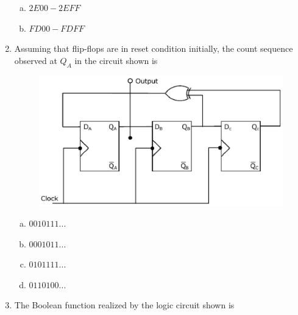 \documentclass[journal,12pt,twocolumn]{IEEEtran}
\begin{document}
\begin{enumerate}
\begin{enumerate}[(a)]
\item $ 2E00 - 2EFF $

\item $ FD00 - FDFF $

\end{enumerate}

\item Assuming that flip-flops are in reset condition initially, the count sequence observed at $Q_A$ in the circuit shown is 

\begin{figure}

\centering

\includegraphics[width=\columnwidth]{./figs/44.eps}

\caption{}

\label{fig:39}

\end{figure} 




\begin{enumerate}[(a)]

\item $ 0010111... $

\item $ 0001011... $

\item $ 0101111... $

\item $ 0110100... $

\end{enumerate}

\item The Boolean function realized by the logic circuit shown is

\begin{figure}

\centering


\end{figure}
\end{enumerate}
\end{document}
